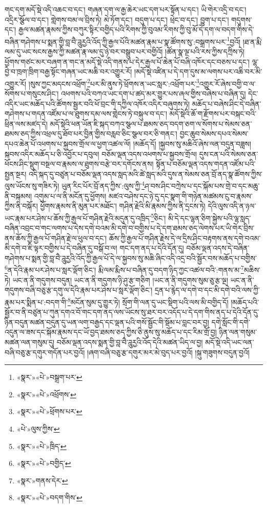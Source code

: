 གང་དག་མདོ་སྡེ་འདི་འཆང་བ་དང་། གཞན་དག་ལ་རྒྱ་ཆེར་ཡང་དག་པར་སྟོན་པ་དང་། ཡི་གེར་འདྲི་བ་དང་། འདྲིར་སྩོལ་བ་དང་། གླེགས་བམ་ལ་བྲིས་ཏེ། མེ་ཏོག་དང་། བདུག་པ་དང་། ཕྲེང་བ་དང་། བྱུག་པ་དང་། གདུགས་དང་། རྒྱལ་མཚན་རྣམས་ཀྱིས་བཀུར་སྟིར་བགྱིད་པའི་རིགས་ཀྱི་བུའམ་རིགས་ཀྱི་བུ་མོ་དེ་དག་ལ་བདག་གིས་དེ་བཞིན་གཤེགས་པ་སྨན་གྱི་བླ་བཻ་ཌཱུརྱའི་འོད་ཀྱི་རྒྱལ་པོའི་མཚན་རྣམ་པ་སྣ་ཚོགས་སུ་:བསྒྲགས་པར་\footnote{«སྣར་»«པེ་»བསྒྲག་པར་}བྱའོ། །ཐ་ན་རྨི་ལམ་དུ་ཡང་སངས་རྒྱས་ཀྱི་མཚན་རྣ་ལམ་དུ་ཉེ་བར་བསྒྲུབ་པར་བགྱིའོ། །ཚོན་སྣ་ལྔ་པའི་རས་ཀྱིས་དཀྲིས་ཏེ། ཕྱོགས་གཙང་མར་བཞག་ན་གང་ན་མདོ་སྡེ་འདི་གནས་པ་དེར་རྒྱལ་པོ་ཆེན་པོ་བཞི་འཁོར་དང་བཅས་པ་དང་། ལྷ་བྱེ་བ་ཁྲག་ཁྲིག་བརྒྱ་སྟོང་གཞན་ཡང་མཆི་བར་འགྱུར་རོ། །མདོ་སྡེ་འཛིན་པ་དེ་དག་དུས་མ་ལགས་པར་འཆི་བར་མི་འགྱུར་རོ། །སུས་ཀྱང་མདངས་འཕྲོག་\footnote{«སྣར་»«པེ་»འཕྲོགས་}པར་མི་ནུས་ཏེ་ཕྲོགས་ན་ཡང་སླར་:འཕྲོག་པར་\footnote{«སྣར་»«པེ་»ཕྲོགས་པར་}འགྱུར་རོ་ཞེས་བགྱི་བ་ལ་སོགས་པ་གསུངས་ཤིང་། འཕགས་པའི་བཀའ་ཡང་དག་པ་ཚད་མར་གྱུར་པས་ཞལ་གྱིས་བཞེས་པ་བཞིན་དུ། དེང་འདིར་ཡང་མཆོད་པའི་ཚོགས་སྦྱར་བའི་ཕོ་བྲང་གི་དཀྱིལ་འཁོར་འདིར་བཞུགས་ཏེ། མཆོད་པ་བཞེས་ཤིང་དེ་བཞིན་གཤེགས་པ་གདན་འཛོམ་པ་ལ་ཐུགས་དམ་ལས་གླེངས་ཏེ་བསྐུལ་བ་དང་། མདོ་སྡེའི་ཆོ་ག་རྫོགས་པར་བསྐང་བའི་ཕྲིན་ལས་མཛད་དེ། མདོ་སྡེའི་ཕན་ཡོན་ཇི་སྐད་བཀའ་སྩལ་པ་ཐམས་ཅད་བདག་ཅག་ལ་སོགས་པ་སེམས་ཅན་ཐམས་ཅད་ཀྱིས་འཕྲལ་དུ་ཐོབ་པར་བྱིན་གྱིས་བརླབ་ཅིང་སྩལ་བར་ཅི་གནང་། བྱང་ཆུབ་སེམས་དཔའ་སེམས་དཔའ་ཆེན་པོ་འཕགས་པ་སྐྱབས་གྲོལ་ལ་ཕྱག་འཚལ་ལོ། །མཆོད་དོ། །སྐྱབས་སུ་མཆིའོ་ཞེས་ལན་བདུན་བཟླས། སྐབས་འདིར་མཆོད་པ་ཅི་འབྱོར་པ་དབུལ། བཅོམ་ལྡན་འདས་འཕགས་པ་སྐྱབས་གྲོལ། དུས་ངན་པའི་སེམས་ཅན་ཕོངས་ཤིང་སྡུག་བསྔལ་བ་རྣམས་ལ་ཐུགས་བརྩེ་བར་དགོངས་ནས། སྟོན་པ་བཅོམ་ལྡན་འདས་གདན་འཛོམ་པའི་སྤྱན་སྔར། འདི་སྐད་དུ་བཙུན་པ་བཅོམ་ལྡན་འདས་སླད་མའི་ཚེ་སླད་མའི་དུས་ན་སེམས་ཅན་བྲོ་ནད་སྣ་ཚོགས་ཀྱིས་ལུས་ཡོངས་སུ་གཟིར་ཏེ། ཡུན་རིང་པོར་བྲོ་ནད་ཀྱིས་:ལུས་ཀྱི་\footnote{«པེ་»ལུས་ཀྱིས་}ཤ་བས་ཤིང་བཀྲེས་པ་དང་སྐོམ་པས་གྲེ་བ་དང་མཆུ་ནི་བསྐམས། འགུམ་པ་ལ་ནི་མངོན་དུ་ཕྱོགས། མཛའ་བཤེས་དང་ཉེ་དུ་དང་སྣག་གི་གཉེན་མཚམས་ངུ་བ་རྣམས་ཀྱིས་ནི་བསྐོར། ཕྱོགས་རྣམས་ནི་མུན་པར་མཐོང་། གཤིན་རྗེའི་མི་རྣམས་ཀྱིས་ནི་དྲངས་ཏེ། དེའི་ལུས་འདི་ན་ཉལ་ཡང་རྣམ་པར་ཤེས་པ་ཆོས་ཀྱི་རྒྱལ་པོ་གཤིན་རྗེའི་མདུན་དུ་འཁྲིད་\footnote{«སྣར་»«པེ་»ཁྲིད་}ཅིང་། མི་དེ་དང་ལྷན་ཅིག་སྐྱེས་པའི་ལྷ་སླད་བཞིན་འབྲང་བ་གང་ལགས་པ་དེས་དགེ་བའམ་མི་དགེ་བ་བགྱིས་པ་དེ་དག་ཐམས་ཅད་ལེགས་པར་ཡི་གེར་བྲིས་ནས་ཆོས་ཀྱི་རྒྱལ་པོ་གཤིན་རྗེ་ལ་ཕུལ་བ་དང་། ཆོས་ཀྱི་རྒྱལ་པོ་གཤིན་རྗེས་དེ་ལ་དྲིས་ཤིང་བརྟགས་ནས་དགེ་བའམ་མི་དགེ་བ་ཇི་ལྟར་བགྱིས་པ་དེ་བཞིན་དུ་བསྒོ་བ་ལ། གང་དག་ནད་པ་དེའི་དོན་དུ། བཅོམ་ལྡན་འདས་དེ་བཞིན་གཤེགས་པ་སྨན་གྱི་བླ་བཻ་ཌཱུརྱའི་འོད་ཀྱི་རྒྱལ་པོ་དེ་ལ་སྐྱབས་སུ་མཆི་ཞིང་འདི་འདྲ་བའི་སྦྱོར་བས་མཆོད་པ་བགྱིས་\footnote{«སྣར་»«པེ་»བགྱིད་}ན་དེའི་རྣམ་པར་ཤེས་པ་སླར་ལྡོག་ཅིང་། རྨི་ལམ་རྨིས་པ་བཞིན་དུ་བདག་ཉིད་ཀྱང་འཚལ་བའི་:གནས་མ་\footnote{«སྣར་»གནས་དེར་}མཆིས་ཏེ། ཡང་ན་ནི་གདུགས་བདུན། ཡང་ན་ནི་གདུགས་ཉི་ཤུ་རྩ་གཅིག །ཡང་ན་ནི་གདུགས་སུམ་ཅུ་རྩ་ལྔ། ཡང་ན་ནི་གདུགས་བཞི་བཅུ་རྩ་དགུ་ལ་དེའི་རྣམ་པར་ཤེས་པ་སླར་ལྡོག་ཅིང་། དྲན་པ་རྙེད་ལ་དགེ་བ་དང་མི་དགེ་བའི་ལས་ཀྱི་རྣམ་པར་སྨིན་པ་:བདག་གི་\footnote{«སྣར་»«པེ་»བདག་གིས་}མངོན་སུམ་དུ་གྱུར་ཏེ། སྲོག་གི་ལན་དུ་ཡང་སྡིག་པའི་ལས་མི་བགྱིད་དོ། །མཆོད་པའི་སྦྱོར་བ་ནི་བཙུན་པ་ཀུན་དགའ་བོ་གང་དག་ནད་ལས་ཡོངས་སུ་ཐར་བར་འདོད་པ་དེ་དག་གིས་ནད་པ་དེའི་དོན་དུ་ཉིན་བདུན་མཚན་བདུན་དུ་ཡན་ལག་བརྒྱད་དང་ལྡན་པའི་གསོ་སྦྱོང་གི་སྡོམ་པ་བླང་བར་བྱ། དགེ་སློང་གི་དགེ་འདུན་ལ་ཟས་དང་སྐོམ་རྣམས་དང་ཡོ་བྱད་ཐམས་ཅད་ཀྱིས་ཅི་ནུས་སུ་མཆོད་པ་དང་རིམ་གྲོ་བྱ། ཉིན་ལན་གསུམ་མཚན་ལན་གསུམ་དུ། བཅོམ་ལྡན་འདས་སྨན་གྱི་བླ་བཻ་ཌཱུརྱའི་འོད་དེའི་མཚན་ཡིད་ལ་བྱ། མདོ་སྡེ་འདི་ཡང་ལན་བཞི་བཅུ་རྩ་དགུར་གདོན་པར་བྱའོ། །ཞག་བཞི་བཅུ་རྩ་དགུར་མར་མེ་བུད་པར་བྱའོ། །སྐུ་གཟུགས་བདུན་བྱའོ། 
